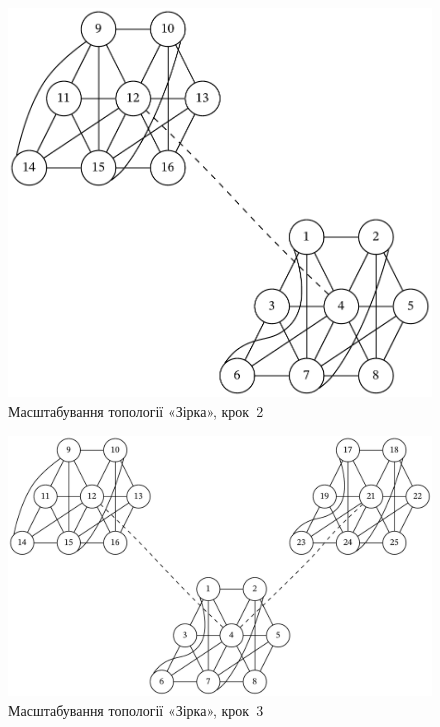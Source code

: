 \documentclass[
	a4paper,
	oneside,
	BCOR = 10mm,
	DIV = 12,
	12pt,
	headings = normal,
]{scrartcl}
\begin{document}
				\begin{figure}[!htbp]
					\centering
					\includegraphics[height=10\baselineskip]{./assets/cluster-08-03-star-s02.pdf}
					\caption{Масштабування топології «Зірка», крок~2}
					\label{fig:cluster-08-03-star-s02}
				\end{figure}

				\begin{figure}[!htbp]
					\centering
					\includegraphics[height=10\baselineskip]{./assets/cluster-08-03-star-s03.pdf}
					\caption{Масштабування топології «Зірка», крок~3}
					\label{fig:cluster-08-03-star-s03}
				\end{figure}
\end{document}
